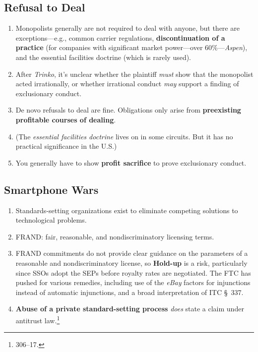 \subsection{Refusal to Deal}

\begin{enumerate}
    \item Monopolists generally are not required to deal with anyone, but 
    there are exceptions---e.g., common carrier regulations, 
    \textbf{discontinuation of a practice} (for companies with significant 
    market power---over 60\%---\emph{Aspen}), and the essential facilities 
    doctrine (which is rarely used).
    \item After \emph{Trinko}, it's unclear whether the plaintiff \emph{must} 
    show that the monopolist acted irrationally, or whether irrational conduct 
    \emph{may} support a finding of exclusionary conduct.
    \item De novo refusals to deal are fine. Obligations only arise from 
    \textbf{preexisting profitable courses of dealing}.
    \item (The \emph{essential facilities doctrine} lives on in some circuits. 
    But it has no practical significance in the U.S.)
    \item You generally have to show \textbf{profit sacrifice} to prove 
    exclusionary conduct.
\end{enumerate}

\subsection{Smartphone Wars}

\begin{enumerate}
    \item Standards-setting organizations exist to eliminate competing 
    solutions to technological problems.
    \item FRAND: fair, reasonable, and nondiscriminatory licensing terms.
    \item FRAND commitments do not provide clear guidance on the parameters of 
    a reasonable and nondiscriminatory license, so \textbf{Hold-up} is a risk, 
    particularly since SSOs adopt the SEPs before royalty rates are 
    negotiated. The FTC has pushed for various remedies, including use of the 
    \emph{eBay} factors for injunctions instead of automatic injunctions, and 
    a broad interpretation of ITC \S\ 337.
    \item \textbf{Abuse of a private standard-setting process} \emph{does} 
    state a claim under antitrust law.\footnote{306--17.}
\end{enumerate}

